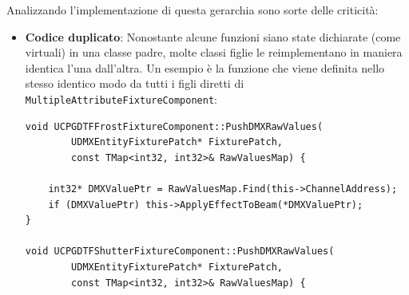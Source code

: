 \documentclass[main.tex]{subfiles}
\begin{document}
Analizzando l'implementazione di questa gerarchia sono sorte delle criticità:
\begin{itemize}
    \item \textbf{Codice duplicato}: Nonostante alcune funzioni siano state dichiarate (come virtuali) in una classe padre, molte classi figlie le reimplementano in maniera identica l'una dall'altra. Un esempio è la funzione \lstinline{} che viene definita nello stesso identico modo da tutti i figli diretti di \lstinline{MultipleAttributeFixtureComponent}:
\lstset{language=UEcpp}
\begin{lstlisting}
void UCPGDTFFrostFixtureComponent::PushDMXRawValues(
        UDMXEntityFixturePatch* FixturePatch,
        const TMap<int32, int32>& RawValuesMap) {

	int32* DMXValuePtr = RawValuesMap.Find(this->ChannelAddress);
	if (DMXValuePtr) this->ApplyEffectToBeam(*DMXValuePtr);
}

void UCPGDTFShutterFixtureComponent::PushDMXRawValues(
        UDMXEntityFixturePatch* FixturePatch,
        const TMap<int32, int32>& RawValuesMap) {


\end{lstlisting}
\end{itemize}
\end{document}
